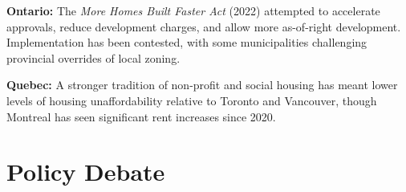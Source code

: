 \textbf{Ontario:} The \textit{More Homes Built Faster Act} (2022) attempted to accelerate approvals, reduce development charges, and allow more as-of-right development. Implementation has been contested, with some municipalities challenging provincial overrides of local zoning.

\textbf{Quebec:} A stronger tradition of non-profit and social housing has meant lower levels of housing unaffordability relative to Toronto and Vancouver, though Montreal has seen significant rent increases since 2020.

\section{Policy Debate}

